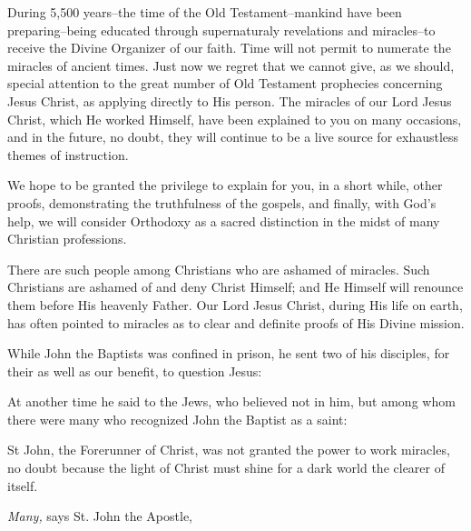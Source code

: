 During 5,500 years--the time of the Old Testament--mankind have been preparing--being educated through supernaturaly revelations and miracles--to receive the Divine Organizer of our faith. Time will not permit to numerate the miracles of ancient times. Just now we regret that we cannot give, as we should, special attention to the great number of Old Testament prophecies concerning Jesus Christ, as applying directly to His person. The miracles of our Lord Jesus Christ, which He worked Himself, have been explained to you on many occasions, and in the future, no doubt, they will continue to be a live source for exhaustless themes of instruction.

We hope to be granted the privilege to explain for you, in a short while, other proofs, demonstrating the truthfulness of the gospels, and finally, with God's help, we will consider Orthodoxy as a sacred distinction in the midst of many Christian professions.

There are such people among Christians who are ashamed of miracles. Such Christians are ashamed of and deny Christ Himself; and He Himself will renounce them before His heavenly Father. Our Lord Jesus Christ, during His life on earth, has often pointed to miracles as to clear and definite proofs of His Divine mission.

While John the Baptists was confined in prison, he sent two of his disciples, for their as well as our benefit, to question Jesus: 

At another time he said to the Jews, who believed not in him, but among whom there were many who recognized John the Baptist as a saint: 

St John, the Forerunner of Christ, was not granted the power to work miracles, no doubt because the light of Christ must shine for a dark world the clearer of itself.

\textit{Many,} says St. John the Apostle, 

